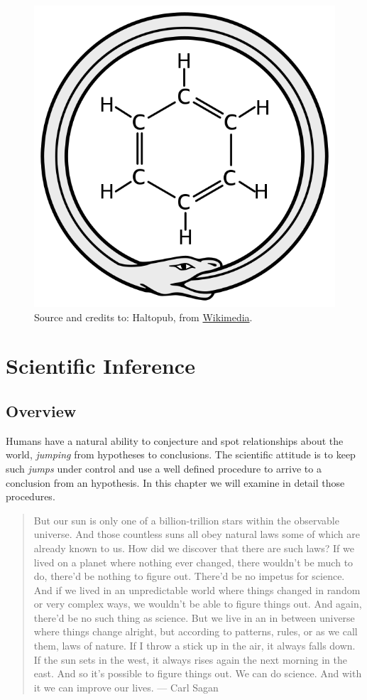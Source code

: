 \documentclass[
]{book}
\begin{document}
\begin{figure}

{\centering \includegraphics[width=0.25\linewidth]{Figures/Ouroboros-benzene} 

}

\caption{Source and credits to: Haltopub, from \href{https://en.wikipedia.org/wiki/File:Ouroboros-benzene.svg}{Wikimedia}.}\label{fig:ouroboros}
\end{figure}

\hypertarget{scientific-inference}{%
\chapter{Scientific Inference}\label{scientific-inference}}

\hypertarget{overview}{%
\section{Overview}\label{overview}}

Humans have a natural ability to conjecture and spot relationships about the world, \emph{jumping} from hypotheses to conclusions. The scientific attitude is to keep such \emph{jumps} under control and use a well defined procedure to arrive to a conclusion from an hypothesis. In this chapter we will examine in detail those procedures.

\begin{quote}
But our sun is only one of a billion-trillion stars within the observable universe. And those countless suns all obey natural laws some of which are already known to us. How did we discover that there are such laws? If we lived on a planet where nothing ever changed, there wouldn't be much to do, there'd be nothing to figure out. There'd be no impetus for science. And if we lived in an unpredictable world where things changed in random or very complex ways, we wouldn't be able to figure things out. And again, there'd be no such thing as science. But we live in an in between universe where things change alright, but according to patterns, rules, or as we call them, laws of nature. If I throw a stick up in the air, it always falls down. If the sun sets in the west, it always rises again the next morning in the east. And so it's possible to figure things out. We can do science. And with it we can improve our lives. --- Carl Sagan
\end{quote}
\end{document}

